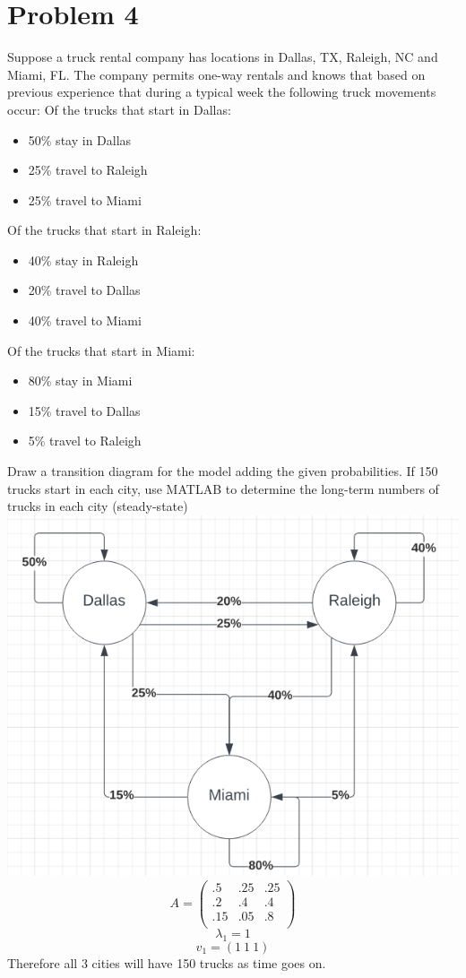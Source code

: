 \documentclass{article}
\begin{document}
\section*{Problem 4}
Suppose a truck rental company has locations in Dallas, TX, Raleigh, NC and Miami, FL. The company permits one-way rentals and knows that based on previous
experience that during a typical week the following truck movements occur:
Of the trucks that start in Dallas:\begin{itemize}
    \item 50\% stay in Dallas
\item 25\% travel to Raleigh
\item 25\% travel to Miami
\end{itemize}
Of the trucks that start in Raleigh:\begin{itemize}
\item 40\% stay in Raleigh
\item 20\% travel to Dallas
\item 40\% travel to Miami
\end{itemize}
Of the trucks that start in Miami:\begin{itemize}
\item 80\% stay in Miami
\item 15\% travel to Dallas
\item 5\% travel to Raleigh
\end{itemize}
Draw a transition diagram for the model adding the given probabilities. If 150
trucks start in each city, use MATLAB to determine the long-term numbers of trucks
in each city (steady-state)\newline\includegraphics[scale=.5]{Pictures/image_2023-04-06_133826624.png} $$A=\begin{pmatrix}.5 & .25 & .25\\ .2 & .4 & .4 \\ .15 & .05 & .8\\
\end{pmatrix}$$ $$\lambda_1=1$$ $$v_1=(1\ 1\ 1)$$ Therefore all 3 cities will have 150 trucks as time goes on.
\end{document}
